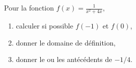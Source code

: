 
\begin{exercice}\label{exoPremiere-0018}

    Pour la fonction \( f(x)=\frac{\displaystyle 1}{\displaystyle x^2+4x }\),
    \begin{enumerate}
        \item
            calculer si possible \( f(-1)\) et \( f(0)\),
        \item
            donner le domaine de définition,
        \item
            donner le ou les antécédents de \( -1/4\).
    \end{enumerate}

\end{exercice}
